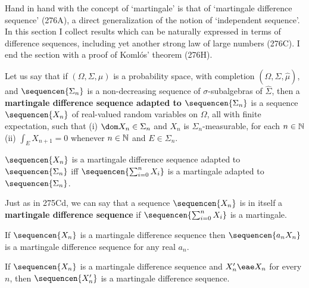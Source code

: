 
\def\chaptername{Probability theory}
\def\sectionname{Martingale difference sequences}


Hand in hand with the concept of `martingale' is that of `martingale
difference sequence' (276A), a direct generalization of the notion of
`independent sequence'.   In this section I collect results which can be
naturally expressed in terms of difference sequences, including yet
another strong law of large numbers (276C).   I end the section with a
proof of Koml\'os' theorem (276H).

   Let us say that if
$(\Omega,\Sigma,\mu)$ is a probability space, with completion
$(\Omega,\hat\Sigma,\hat\mu)$, and $\sequencen{\Sigma_n}$ is a
non-decreasing sequence of $\sigma$-subalgebras of $\hat\Sigma$, then a
{\bf martingale difference sequence adapted to $\sequencen{\Sigma_n}$}
is a sequence $\sequencen{X_n}$ of real-valued random variables on
$\Omega$, all with finite expectation, such that (i)
$\dom X_n\in\Sigma_n$ and
$X_n$ is $\Sigma_n$-measurable, for each $n\in\Bbb N$ (ii)
$\int_EX_{n+1}=0$ whenever $n\in\Bbb N$ and $E\in\Sigma_n$.

 $\sequencen{X_n}$ is a martingale difference
sequence adapted
to $\sequencen{\Sigma_n}$ iff $\sequencen{\sum_{i=0}^nX_i}$ is a
martingale adapted to $\sequencen{\Sigma_n}$.

Just as in 275Cd, we can say that a sequence $\sequencen{X_n}$ is in
itself a {\bf martingale difference sequence} if
$\sequencen{\sum_{i=0}^nX_i}$ is a martingale.

 If $\sequencen{X_n}$ is a martingale difference
sequence then $\sequencen{a_nX_n}$ is a martingale difference sequence
for any real $a_n$.

  If $\sequencen{X_n}$ is a martingale difference
sequence and $X'_n\eae X_n$ for every $n$, then $\sequencen{X'_n}$ is
a martingale difference sequence.   

